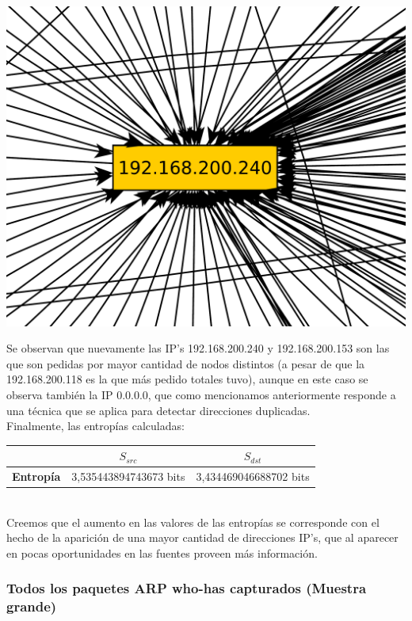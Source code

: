 \includegraphics[scale=0.3,clip=true,trim=20 0 0 0]{graphics/laburomediano254.pdf}


\indent Se observan que nuevamente las IP's 192.168.200.240 y 192.168.200.153 son las que son pedidas por mayor cantidad de nodos distintos (a pesar de que la 192.168.200.118 es la que más pedido totales tuvo), aunque en este caso se observa también la IP 0.0.0.0, que como mencionamos anteriormente responde a una técnica que se aplica para detectar direcciones duplicadas.\\

\indent Finalmente, las entropías calculadas:\\

\begin{centering}
	\begin{tabular}{ | c | c | c |} \hline
	   & \textbf{$S_{src}$} & \textbf{$S_{dst}$} \\ \hline
	  	\textbf{Entropía} & 3,535443894743673 bits & 3,434469046688702 bits \\ \hline
	\end{tabular}
\end{centering}\\


\indent Creemos que el aumento en las valores de las entropías se corresponde con el hecho de la aparición de una mayor cantidad de direcciones IP's, que al aparecer en pocas oportunidades en las fuentes proveen más información.\\


\subsubsection{Todos los paquetes ARP who-has capturados (Muestra grande)}


